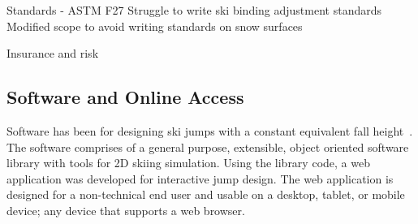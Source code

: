 \documentclass{article}
\begin{document}
Standards - ASTM F27
Struggle to write ski binding adjustment standards
Modified scope to avoid writing standards on snow surfaces

Insurance and risk 

\subsection{Software and Online Access}
%
Software has been for designing ski jumps with a constant equivalent fall
height~\cite{Moore2018}. The software comprises of a general purpose,
extensible, object oriented software library with tools for 2D skiing
simulation. Using the library code, a web application was developed for
interactive jump design. The web application is designed for a non-technical
end user and usable on a desktop, tablet, or mobile device; any device that
supports a web browser.
\end{document}
